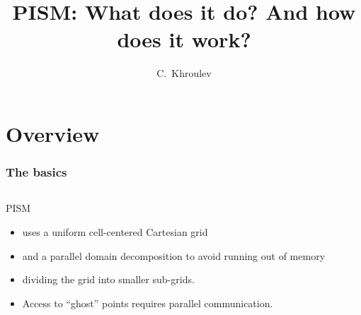 \documentclass[hide notes,intlimits]{beamer}
\title{PISM: What does it do? And how does it work?}
\author{C.~Khroulev}
\institute{University of Alaska Fairbanks}
\date{}
\begin{document}
\begin{frame}
  \titlepage
\end{frame}


\section{Overview}
\label{sec:overview}

\begin{frame}
  \frametitle{The basics}

  \begin{columns}
    \begin{column}{0.5\linewidth}
      PISM
      \begin{itemize}
      \item<1-> uses a uniform cell-centered Cartesian grid
      \item<2-> and a parallel domain decomposition to avoid running out
        of memory
      \item<3-> dividing the grid into smaller sub-grids.
      \item<4> Access to ``ghost'' points requires parallel communication.
      \end{itemize}
    \end{column}


\end{columns}
\end{frame}
\end{document}
